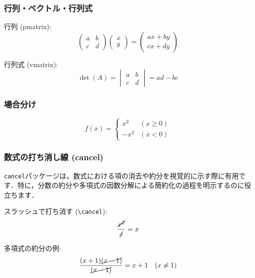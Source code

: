 \documentclass[
  a4paper,  %
  11pt,     %
]{ltjsarticle}%
\begin{document}
\subsubsection{行列・ベクトル・行列式}

行列 (pmatrix):
\begin{equation}
  \begin{pmatrix} a & b \\
    c & d \end{pmatrix}
  \begin{pmatrix} x \\
    y \end{pmatrix} =
  \begin{pmatrix} ax+by \\
    cx+dy \end{pmatrix}
\end{equation}

行列式 (vmatrix):
\begin{equation}
  \det(A) = 
  \begin{vmatrix}
    a & b \\
    c & d
  \end{vmatrix} = ad - bc
\end{equation}


\subsubsection{場合分け}

\begin{equation}
  f(x) = \begin{cases}
    x^2 & (x \ge 0) \\
    -x^2 & (x < 0)
  \end{cases}
\end{equation}

\subsubsection{数式の打ち消し線 (cancel)}\verb|cancel|パッケージは，数式における項の消去や約分を視覚的に示す際に有用です．特に，分数の約分や多項式の因数分解による簡約化の過程を明示するのに役立ちます．

スラッシュで打ち消す (\verb|\cancel|):
\begin{equation}
  \frac{\cancel{x^2}}{\cancel{x}} = x
\end{equation}

多項式の約分の例:
\begin{equation}
  \frac{(x+1)\cancel{(x-1)}}{\cancel{(x-1)}} = x+1 \quad (x \neq 1)
\end{equation}
\end{document}
